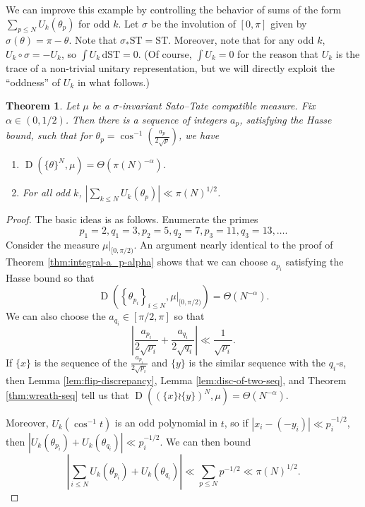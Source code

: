\documentclass{article}
\DeclareMathOperator{\D}{D}
\newcommand{\dd}{\mathrm{d}}
\newcommand{\ST}{\mathrm{ST}}
\newtheorem{theorem}{Theorem}
\begin{document}
We can improve this example by controlling the behavior of sums of the form 
$\sum_{p\leqslant N} U_k(\theta_p)$ for odd $k$. Let $\sigma$ be 
the involution of $[0,\pi]$ given by $\sigma(\theta) = \pi-\theta$. Note that 
$\sigma_\ast \ST = \ST$. Moreover, note that for any odd $k$, 
$U_k\circ\sigma = - U_k$, so $\int U_k\, \dd\ST = 0$. (Of course, 
$\int U_k = 0$ for the reason that $U_k$ is the trace of a non-trivial unitary 
representation, but we will directly exploit the ``oddness'' of $U_k$ in what 
follows.)

\begin{theorem}\label{thm:int-flip-seq}
Let $\mu$ be a $\sigma$-invariant Sato--Tate compatible measure. Fix 
$\alpha\in (0,1/2)$. Then there is a sequence of integers $a_p$, satisfying 
the Hasse bound, such that for 
$\theta_p =\cos^{-1}\left( \frac{a_p}{2\sqrt p}\right)$, we have
\begin{enumerate}
\item
$\D(\{\theta\}^N,\mu) = \Theta(\pi(N)^{-\alpha})$. 

\item
For all odd $k$, 
$\left| \sum_{k\leqslant N} U_k(\theta_p)\right| \ll \pi(N)^{1/2}$. 
\end{enumerate}
\end{theorem}
\begin{proof}
The basic ideas is as follows. Enumerate the primes 
\[
	p_1 = 2, q_1 = 3, p_2 = 5, q_2 = 7, p_3 = 11, q_3 = 13, \dots .
\]
Consider the measure $\left.\mu\right|_{[0,\pi/2)}$. An argument 
nearly identical to the proof of Theorem \ref{thm:integral-a_p-alpha} shows 
that we can choose $a_{p_i}$ satisfying the Hasse bound so that 
\[
	\D\left( \left\{\theta_{p_i}\right\}_{i\leqslant N},\left.\mu\right|_{[0,\pi/2)}\right) = \Theta(N^{-\alpha}) .
\]
We can also choose the $a_{q_i}\in [\pi/2,\pi]$ so that 
\[
	\left| \frac{a_{p_i}}{2\sqrt{p_i}} + \frac{a_{q_i}}{2\sqrt{q_i}}\right| \ll \frac{1}{\sqrt{p_i}} .
\]
If $\{x\}$ is the sequence of the $\frac{a_{p_i}}{2\sqrt{p_i}}$ and $\{y\}$ is 
the similar sequence with the $q_i$-s, then Lemma \ref{lem:flip-discrepancy}, 
Lemma \ref{lem:disc-of-two-seq}, and Theorem \ref{thm:wreath-seq} tell us 
that $\D((\{x\}\wr\{y\})^N,\mu) = \Theta(N^{-\alpha})$. 

Moreover, $U_k(\cos^{-1} t)$ is an odd polynomial in $t$, so if 
$|x_i - (-y_i)| \ll p_i^{-1/2}$, then 
$|U_k(\theta_{p_i}) + U_k(\theta_{q_i})| \ll p_i^{-1/2}$. We can then bound 
\[
	\left| \sum_{i\leqslant N} U_k(\theta_{p_i}) + U_k(\theta_{q_i})\right| \ll \sum_{p\leqslant N} p^{-1/2} \ll \pi(N)^{1/2} .
\]
\end{proof}
\end{document}
